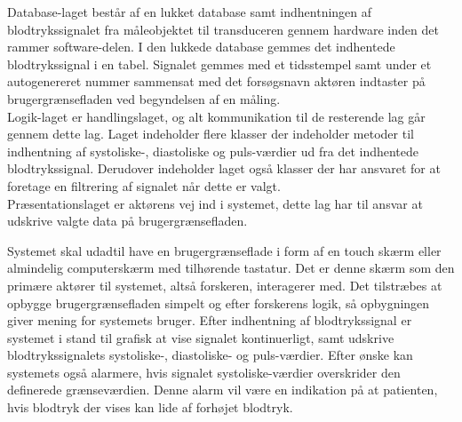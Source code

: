 Database-laget består af en lukket database samt indhentningen af blodtrykssignalet fra måleobjektet til transduceren gennem hardware inden det rammer software-delen. I den lukkede database gemmes det indhentede blodtrykssignal i en tabel. Signalet gemmes med et tidsstempel samt under et autogenereret nummer sammensat med det forsøgsnavn aktøren indtaster på brugergrænsefladen ved begyndelsen af en måling. \\
Logik-laget er handlingslaget, og alt kommunikation til de resterende lag går gennem dette lag. Laget indeholder flere klasser der indeholder metoder til indhentning af systoliske-, diastoliske og puls-værdier ud fra det indhentede blodtrykssignal. Derudover indeholder laget også klasser der har ansvaret for at foretage en filtrering af signalet når dette er valgt. \\ Præsentationslaget er aktørens vej ind i systemet, dette lag har til ansvar at udskrive valgte data på brugergrænsefladen. 

Systemet skal udadtil have en brugergrænseflade i form af en touch skærm eller almindelig computerskærm med tilhørende tastatur. Det er denne skærm som den primære aktører til systemet, altså forskeren, interagerer med. Det tilstræbes at opbygge brugergrænsefladen simpelt og efter forskerens logik, så opbygningen giver mening for systemets bruger. Efter indhentning af blodtrykssignal er systemet i stand til grafisk at vise signalet kontinuerligt, samt udskrive blodtrykssignalets systoliske-, diastoliske- og puls-værdier. Efter ønske kan systemets også alarmere, hvis signalet systoliske-værdier overskrider den definerede grænseværdien. Denne alarm vil være en indikation på at patienten, hvis blodtryk der vises kan lide af forhøjet blodtryk.
